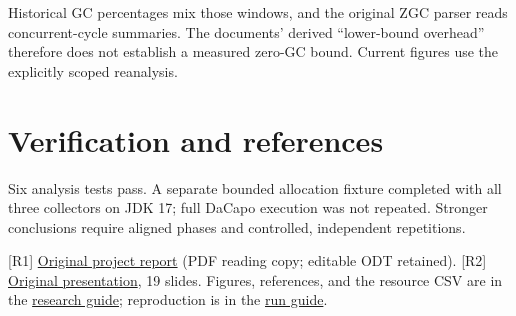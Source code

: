 \documentclass[10pt,a4paper]{article}
\begin{document}
Historical GC percentages mix those windows, and the original ZGC parser reads concurrent-cycle summaries. The documents' derived ``lower-bound overhead'' therefore does not establish a measured zero-GC bound. Current figures use the explicitly scoped reanalysis.
\section*{Verification and references}
Six analysis tests pass. A separate bounded allocation fixture completed with all three collectors on JDK 17; full DaCapo execution was not repeated. Stronger conclusions require aligned phases and controlled, independent repetitions.

{\small [R1] \href{https://github.com/mitsosasim/garbage_collectors_research/blob/main/docs/sources/project-report.pdf}{Original project report} (PDF reading copy; editable ODT retained). [R2] \href{https://github.com/mitsosasim/garbage_collectors_research/blob/main/docs/sources/project-presentation.pdf}{Original presentation}, 19 slides. Figures, references, and the resource CSV are in the \href{https://github.com/mitsosasim/garbage_collectors_research/blob/main/docs/RESEARCH.md}{research guide}; reproduction is in the \href{https://github.com/mitsosasim/garbage_collectors_research/blob/main/docs/SETUP.md}{run guide}.}
\end{document}
